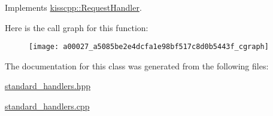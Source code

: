 Implements \hyperlink{a00037_a3606f772c07297826847a8e36226cdaa}{kisscpp\-::\-Request\-Handler}.



Here is the call graph for this function\-:\nopagebreak
\begin{figure}[H]
\begin{center}
\leavevmode
\texttt{[image: a00027\_a5085be2e4dcfa1e98bf517c8d0b5443f\_cgraph]}
\end{center}
\end{figure}




The documentation for this class was generated from the following files\-:\begin{DoxyCompactItemize}
\item 
\hyperlink{a00079}{standard\-\_\-handlers.\-hpp}\item 
\hyperlink{a00078}{standard\-\_\-handlers.\-cpp}\end{DoxyCompactItemize}

